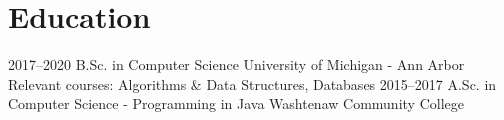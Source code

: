 \documentclass[]{cv-style}
\begin{document}
\section{Education}

\begin{entrylist}
\entry
{2017--2020}
{B.Sc. {\normalfont in Computer Science}}
{University of Michigan - Ann Arbor}
{Relevant courses: Algorithms \& Data Structures, Databases}
{\vspace{-0.3cm}}
\entry
{2015--2017}
{A.Sc. {\normalfont in Computer Science - Programming in Java}}
{Washtenaw Community College}

\end{entrylist}

\end{document}
